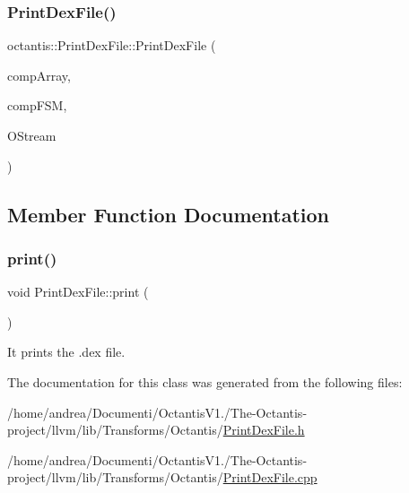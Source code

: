 \subsubsection{\texorpdfstring{Print\+Dex\+File()}{PrintDexFile()}}
{\footnotesize\ttfamily octantis\+::\+Print\+Dex\+File\+::\+Print\+Dex\+File (\begin{DoxyParamCaption}\item[{\hyperlink{classoctantis_1_1LiMArray}{Li\+M\+Array} $\ast$}]{comp\+Array,  }\item[{\hyperlink{classoctantis_1_1FiniteStateMachine}{Finite\+State\+Machine} $\ast$}]{comp\+F\+SM,  }\item[{raw\+\_\+ostream $\ast$}]{O\+Stream }\end{DoxyParamCaption})\hspace{0.3cm}{\ttfamily [inline]}}



\subsection{Member Function Documentation}
\mbox{\label{classoctantis_1_1PrintDexFile_a81a7a3c3c35f91aabd83c2902f56dfb1}} 
\subsubsection{\texorpdfstring{print()}{print()}}
{\footnotesize\ttfamily void Print\+Dex\+File\+::print (\begin{DoxyParamCaption}{ }\end{DoxyParamCaption})}



It prints the .dex file. 



The documentation for this class was generated from the following files\+:\begin{DoxyCompactItemize}
\item 
/home/andrea/\+Documenti/\+Octantis\+V1./\+The-\/\+Octantis-\/project/llvm/lib/\+Transforms/\+Octantis/\hyperlink{PrintDexFile_8h}{Print\+Dex\+File.\+h}\item 
/home/andrea/\+Documenti/\+Octantis\+V1./\+The-\/\+Octantis-\/project/llvm/lib/\+Transforms/\+Octantis/\hyperlink{PrintDexFile_8cpp}{Print\+Dex\+File.\+cpp}\end{DoxyCompactItemize}
